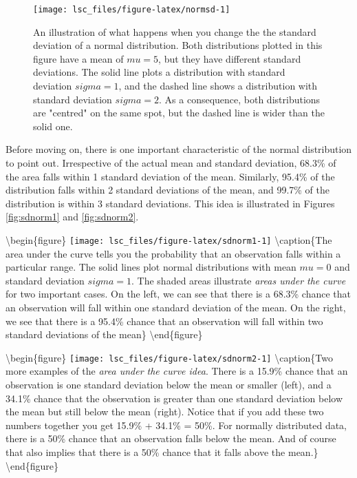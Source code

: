 \documentclass[
]{book}
\theoremstyle{definition}
\theoremstyle{definition}
\theoremstyle{definition}
\theoremstyle{definition}
\theoremstyle{remark}
\begin{document}
\begin{figure}

{\centering \texttt{[image: lsc\_files/figure-latex/normsd-1]} 

}

\caption{An illustration of what happens when you change the the standard deviation of a normal distribution. Both distributions plotted in this figure have a mean of $mu = 5$, but they have different standard deviations. The solid line plots a distribution with standard deviation $sigma=1$, and the dashed line shows a distribution with standard deviation $sigma = 2$. As a consequence, both distributions are "centred" on the same spot, but the dashed line is wider than the solid one.}\label{fig:normsd}
\end{figure}

Before moving on, there is one important characteristic of the normal distribution to point out. Irrespective of the actual mean and standard deviation, 68.3\% of the area falls within 1 standard deviation of the mean. Similarly, 95.4\% of the distribution falls within 2 standard deviations of the mean, and 99.7\% of the distribution is within 3 standard deviations. This idea is illustrated in Figures \ref{fig:sdnorm1} and \ref{fig:sdnorm2}.

\textbackslash begin\{figure\}
\texttt{[image: lsc\_files/figure-latex/sdnorm1-1]} \textbackslash caption\{The area under the curve tells you the probability that an observation falls within a particular range. The solid lines plot normal distributions with mean \(mu=0\) and standard deviation \(sigma=1\). The shaded areas illustrate \emph{areas under the curve} for two important cases. On the left, we can see that there is a 68.3\% chance that an observation will fall within one standard deviation of the mean. On the right, we see that there is a 95.4\% chance that an observation will fall within two standard deviations of the mean\}\label{fig:sdnorm1}
\textbackslash end\{figure\}

\textbackslash begin\{figure\}
\texttt{[image: lsc\_files/figure-latex/sdnorm2-1]} \textbackslash caption\{Two more examples of the \emph{area under the curve idea}. There is a 15.9\% chance that an observation is one standard deviation below the mean or smaller (left), and a 34.1\% chance that the observation is greater than one standard deviation below the mean but still below the mean (right). Notice that if you add these two numbers together you get 15.9\% + 34.1\% = 50\%. For normally distributed data, there is a 50\% chance that an observation falls below the mean. And of course that also implies that there is a 50\% chance that it falls above the mean.\}\label{fig:sdnorm2}
\textbackslash end\{figure\}
\end{document}
